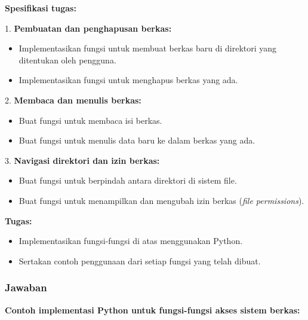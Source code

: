 \documentclass[12pt]{article}
\begin{document}
\textbf{Spesifikasi tugas:}

1. \textbf{Pembuatan dan penghapusan berkas:}
    \begin{itemize}
        \item Implementasikan fungsi untuk membuat berkas baru di direktori yang ditentukan oleh pengguna.
        \item Implementasikan fungsi untuk menghapus berkas yang ada.
    \end{itemize}

2. \textbf{Membaca dan menulis berkas:}
    \begin{itemize}
        \item Buat fungsi untuk membaca isi berkas.
        \item Buat fungsi untuk menulis data baru ke dalam berkas yang ada.
    \end{itemize}

3. \textbf{Navigasi direktori dan izin berkas:}
    \begin{itemize}
        \item Buat fungsi untuk berpindah antara direktori di sistem file.
        \item Buat fungsi untuk menampilkan dan mengubah izin berkas (\textit{file permissions}).
    \end{itemize}

\textbf{Tugas:}
\begin{itemize}
    \item Implementasikan fungsi-fungsi di atas menggunakan Python.
    \item Sertakan contoh penggunaan dari setiap fungsi yang telah dibuat.
\end{itemize}

\subsubsection*{Jawaban}

\textbf{Contoh implementasi Python untuk fungsi-fungsi akses sistem berkas:}
\end{document}
